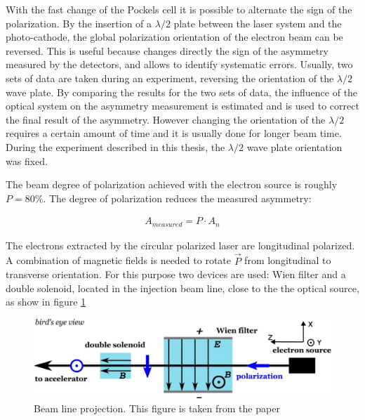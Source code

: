 With the fast change of the Pockels cell it is possible to alternate the sign of the polarization. By the insertion of a $\lambda/2$ plate between the laser system and the photo-cathode, the global polarization orientation of the electron beam can be reversed. This is useful because changes directly the sign of the asymmetry measured by the detectors, and allows to identify systematic errors. Usually, two sets of data are taken during an experiment, reversing the orientation of the $\lambda/2$ wave plate. By comparing the results for the two sets of data, the influence of the optical system on the asymmetry measurement is estimated and is used to correct the final result of the asymmetry. However changing the orientation of the $\lambda/2$ requires a certain amount of time and it is usually done for longer beam time. During the experiment described in this thesis, the $\lambda/2$ wave plate orientation was fixed. 

The beam degree of polarization achieved with the electron source is roughly $P = 80 \% $. The degree of polarization reduces the measured asymmetry:

\begin{align*}
A_{measured} = P \cdot A_{n}
\end{align*}

The electrons extracted by the circular polarized laser are longitudinal polarized. A combination of magnetic fields is needed to rotate $\vec{P}$ from longitudinal to transverse orientation. For this purpose two devices are used: Wien filter and a double solenoid, located in the injection beam line, close to the the optical source, as show in figure \ref{fig:Iniezione}

\begin{figure}[hbtp]
\centering
\includegraphics[width = \textwidth]{ExperimentalSetup/InjectionLine.pdf}
\caption{Beam line projection. This figure is taken from the paper \cite{Schlimme:2016rrp}}
\label{fig:Iniezione}
\end{figure}


